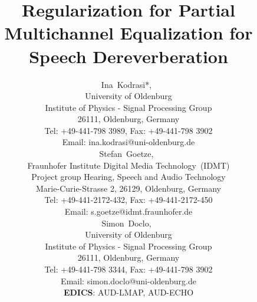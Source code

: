 \documentclass[draftcls,onecolumn,11pt]{IEEEtran}
\begin{document}
%
\title{Regularization for Partial Multichannel Equalization for Speech Dereverberation}
\author{Ina~Kodrasi*,~ \\
University of Oldenburg \\[-0.2cm] Institute of Physics - Signal
Processing Group \\[-0.2cm] 26111, Oldenburg, Germany\\[-0.2cm] Tel:
+49-441-798 3989, Fax: +49-441-798 3902 \\[-0.2cm] Email:
ina.kodrasi@uni-oldenburg.de\\[+0.5cm]
Stefan~Goetze,~\\ Fraunhofer Institute
Digital Media Technology~(IDMT) \\[-0.2cm] Project group Hearing,
Speech and Audio Technology \\[-0.2cm] Marie-Curie-Strasse 2, 26129,
Oldenburg, Germany \\[-0.2cm] Tel: +49-441-2172-432, Fax:
+49-441-2172-450\\[-0.2cm] Email: s.goetze@idmt.fraunhofer.de
\\[+0.5cm] Simon~Doclo,~ \\ University of
Oldenburg \\[-0.2cm] Institute of Physics - Signal Processing Group
\\[-0.2cm] 26111, Oldenburg, Germany\\[-0.2cm] Tel: +49-441-798 3344,
Fax: +49-441-798 3902 \\[-0.2cm] Email:
simon.doclo@uni-oldenburg.de\\[+0.5cm] {\bf EDICS}: AUD-LMAP,
AUD-ECHO}


\maketitle
\newpage
\end{document}
